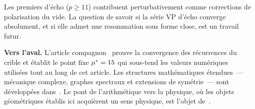 \documentclass[12pt,a4paper]{article}
\begin{document}
Les premiers d'écho ($p \geq 11$) contribuent perturbativement comme
corrections de polarisation du vide. La question de savoir si la
série VP d'écho converge absolument, et si elle admet une
resommation sous forme close, est un travail futur.

\textbf{Vers l'aval.}
L'article compagnon~\cite{companion_M3} prouve la convergence des
récurrences du crible et établit le point fixe ${\mu^{*}} = 15$ qui
sous-tend les valeurs numériques utilisées tout au long de cet
article. Les structures mathématiques étendues~--- mécanique
complexe, graphes spectraux et extensions de symétrie~--- sont
développées dans~\cite{companion_M4}. Le pont de l'arithmétique vers
la physique, où les objets géométriques établis ici acquièrent un
sens physique, est l'objet de~\cite{companion_M5}.



\end{document}
